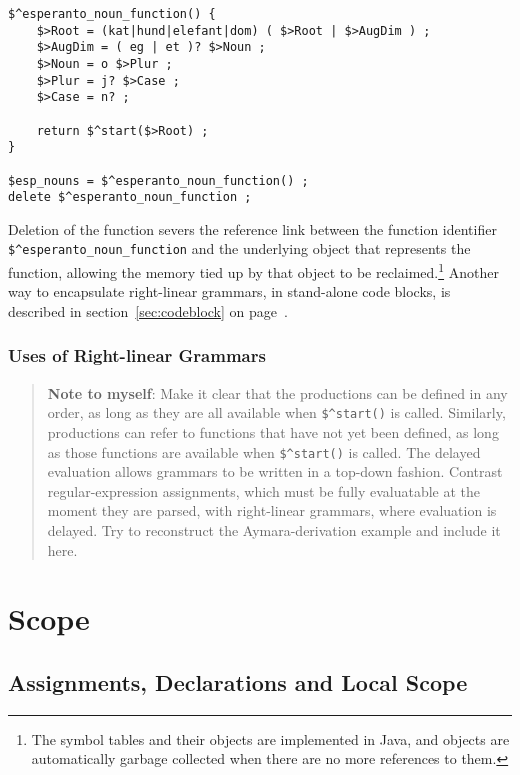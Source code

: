 \begin{Verbatim}
$^esperanto_noun_function() {
	$>Root = (kat|hund|elefant|dom) ( $>Root | $>AugDim ) ;
	$>AugDim = ( eg | et )? $>Noun ;
	$>Noun = o $>Plur ;
	$>Plur = j? $>Case ;
	$>Case = n? ;

	return $^start($>Root) ;
}

$esp_nouns = $^esperanto_noun_function() ;
delete $^esperanto_noun_function ;
\end{Verbatim}

Deletion of the function severs the reference link between the function
identifier \verb!$^esperanto_noun_function! and the underlying object that
represents the function, allowing the memory tied up by that object to be
reclaimed.\footnote{The symbol tables and their objects are implemented in
Java, and objects are automatically garbage collected when there are no
more references to them.}  Another way to encapsulate right-linear
grammars, in stand-alone code blocks, is described in
section~\ref{sec:codeblock} on page~\pageref{sec:codeblock}.

\subsubsection{Uses of Right-linear Grammars}

\begin{quote}
\textbf{Note to myself}:   Make it clear that the productions can be defined in any order, as long as they
are all available when \verb!$^start()! is called. Similarly,
productions can refer to functions that have not yet been defined,
as long as those functions are available when \verb!$^start()! is
called.  The delayed evaluation allows grammars to be written in a top-down fashion.  Contrast
regular-expression assignments, which must be fully evaluatable at the
moment they are parsed, with right-linear grammars, where
evaluation is delayed.
Try to reconstruct the Aymara-derivation example and include it here.  
\end{quote}



\section{Scope}

\subsection{Assignments, Declarations and Local Scope}


